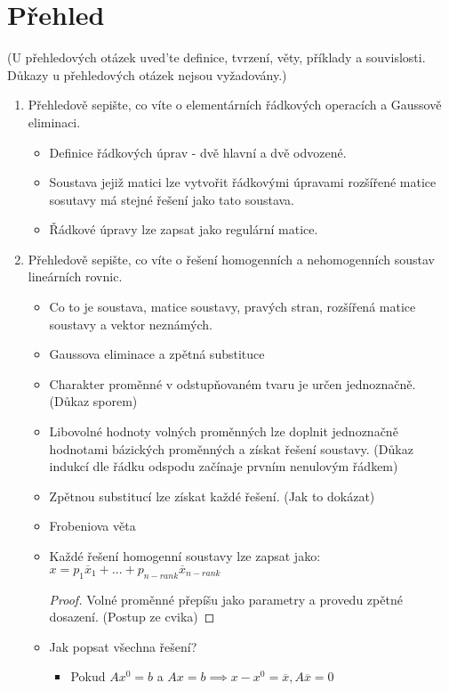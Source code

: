 \documentclass[10pt,a4paper]{article}
\begin{document}
\newpage
\part{Přehled}
(U  přehledových  otázek  uved’te  definice,  tvrzení,  věty,  příklady  a  souvislosti.  Důkazy  u přehledových otázek nejsou vyžadovány.)


\begin{enumerate}

\item Přehledově sepište, co víte o elementárních řádkových operacích a Gaussově eliminaci. 

\begin{itemize}[label=$\circ$]
\item Definice řádkových úprav - dvě hlavní a dvě odvozené.
\item Soustava jejiž matici lze vytvořit řádkovými úpravami rozšířené matice sosutavy má stejné řešení jako tato soustava.

\item Řádkové úpravy lze zapsat jako regulární matice. 
\end{itemize}

\item Přehledově sepište, co víte o řešení homogenních a nehomogenních soustav lineárních rovnic.

\begin{itemize}[label=$\circ$]
\item Co to je soustava, matice soustavy, pravých stran, rozšířená matice soustavy a vektor neznámých.
\item Gaussova eliminace a zpětná substituce
\item Charakter proměnné v odstupňovaném tvaru je určen jednoznačně. (Důkaz sporem)
\item Libovolné hodnoty volných proměnných lze doplnit jednoznačně hodnotami bázických proměnných a získat řešení soustavy. (Důkaz indukcí dle řádku odspodu začínaje prvním nenulovým řádkem)
\item Zpětnou substitucí lze získat každé řešení. (Jak to dokázat)
\item Frobeniova věta
\item Každé řešení homogenní soustavy lze zapsat jako: $x = p_1\overline{x}_1 + ... + p_{n-rank}\overline{x}_{n-rank} $
\begin{proof}
Volné proměnné přepíšu jako parametry a provedu zpětné dosazení. (Postup ze cvika)
\end{proof}

\item Jak popsat všechna řešení?
\begin{itemize}
\item Pokud $Ax^0 = b$ a $Ax = b \implies x-x^0 = \overline{x}, A\overline{x} = 0$


\end{itemize}
\end{itemize}
\end{enumerate}
\end{document}
